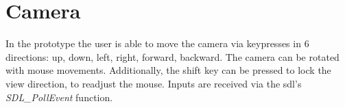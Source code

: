 












\section{Camera}
In the prototype the user is able to move the camera via keypresses in 6 directions: up, down, left, right, forward, backward. The camera can be rotated with mouse movements. Additionally, the shift key can be pressed to lock the view direction, to readjust the mouse. Inputs are received via the \gls{sdl}'s \cite{sdl} \textit{SDL\_PollEvent} function.

